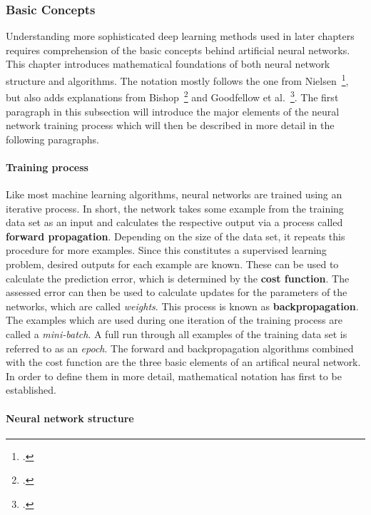 \subsubsection{Basic Concepts}
\label{sub:dl_concepts}

Understanding more sophisticated deep learning methods used in later
chapters requires comprehension of the basic concepts behind artificial
neural networks.
This chapter introduces mathematical foundations of both neural network
structure and algorithms.
The notation mostly follows the one from Nielsen~\footcite{Nielsen2015}, but also
adds explanations from Bishop~\footcite{Bishop2006} and Goodfellow et al.~\footcite{Goodfellow2016}.
The first paragraph in this subsection will introduce the major elements
of the neural network training process which will then be described in more
detail in the following paragraphs.

\paragraph{Training process}

Like most machine learning algorithms, neural networks are trained using an iterative process.
In short, the network takes some example from the training data set as an input 
and calculates the respective output via a process called 
\textbf{forward propagation}.
Depending on the size of the data set, it repeats this procedure for more 
examples.
Since this constitutes a supervised learning problem, desired outputs for
each example are known.
These can be used to calculate the prediction error, which is determined by the
\textbf{cost function}.
The assessed error can then be used to calculate updates for the parameters of
the networks, which are called \textit{weights}.
This process is known as \textbf{backpropagation}.
The examples which are used during one iteration of the training process are
called a \textit{mini-batch}.
A full run through all examples of the training data set is referred to as an
\textit{epoch}.
The forward and backpropagation algorithms combined with the cost function are the three
basic elements of an artifical neural network. 
In order to define them in more detail, mathematical notation has first to be
established.

\paragraph{Neural network structure}

